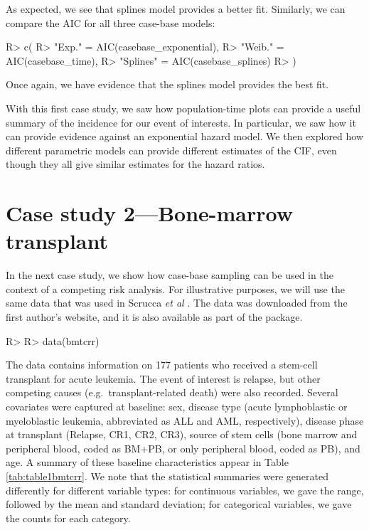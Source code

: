 \documentclass[
]{jss}
\begin{document}
As expected, we see that splines model provides a better fit. Similarly,
we can compare the AIC for all three case-base models:

\begin{CodeChunk}

\begin{CodeInput}
R> c(
R>   "Exp." = AIC(casebase_exponential),
R>   "Weib." = AIC(casebase_time),
R>   "Splines" = AIC(casebase_splines)
R> )
\end{CodeInput}
\end{CodeChunk}

Once again, we have evidence that the splines model provides the best
fit.

With this first case study, we saw how population-time plots can provide
a useful summary of the incidence for our event of interests. In
particular, we saw how it can provide evidence against an exponential
hazard model. We then explored how different parametric models can
provide different estimates of the CIF, even though they all give
similar estimates for the hazard ratios.

\hypertarget{case-study-2bone-marrow-transplant}{%
\section{Case study 2---Bone-marrow
transplant}\label{case-study-2bone-marrow-transplant}}

In the next case study, we show how case-base sampling can be used in
the context of a competing risk analysis. For illustrative purposes, we
will use the same data that was used in Scrucca \emph{et al}
\citeyearpar{scrucca2010regression}. The data was downloaded from the
first author's website, and it is also available as part of the
 package.

\begin{CodeChunk}

\begin{CodeInput}
R> 
R> data(bmtcrr)
\end{CodeInput}
\end{CodeChunk}

The data contains information on 177 patients who received a stem-cell
transplant for acute leukemia. The event of interest is relapse, but
other competing causes (e.g.~transplant-related death) were also
recorded. Several covariates were captured at baseline: sex, disease
type (acute lymphoblastic or myeloblastic leukemia, abbreviated as ALL
and AML, respectively), disease phase at transplant (Relapse, CR1, CR2,
CR3), source of stem cells (bone marrow and peripheral blood, coded as
BM+PB, or only peripheral blood, coded as PB), and age. A summary of
these baseline characteristics appear in Table \ref{tab:table1bmtcrr}.
We note that the statistical summaries were generated differently for
different variable types: for continuous variables, we gave the range,
followed by the mean and standard deviation; for categorical variables,
we gave the counts for each category.
\end{document}
